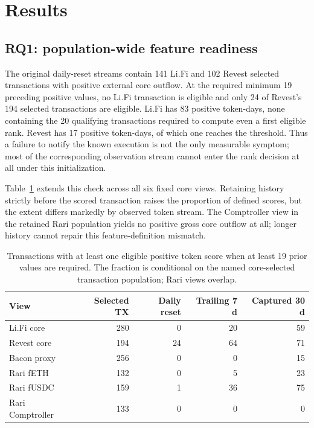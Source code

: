 \documentclass[preprint,12pt,authoryear]{elsarticle}
\begin{document}
\section{Results}\label{sec:results}

\subsection{RQ1: population-wide feature readiness}
The original daily-reset streams contain 141 Li.Fi and 102 Revest selected transactions with positive external core outflow. At the required minimum 19 preceding positive values, no Li.Fi transaction is eligible and only 24 of Revest's 194 selected transactions are eligible. Li.Fi has 83 positive token-days, none containing the 20 qualifying transactions required to compute even a first eligible rank. Revest has 17 positive token-days, of which one reaches the threshold. Thus a failure to notify the known execution is not the only measurable symptom; most of the corresponding observation stream cannot enter the rank decision at all under this initialization.

Table~\ref{tab:eligibility} extends this check across all six fixed core views. Retaining history strictly before the scored transaction raises the proportion of defined scores, but the extent differs markedly by observed token stream. The Comptroller view in the retained Rari population yields no positive gross core outflow at all; longer history cannot repair this feature-definition mismatch.

\begin{table}[htbp]
\centering\small
\caption{Transactions with at least one eligible positive token score when at least 19 prior values are required. The fraction is conditional on the named core-selected transaction population; Rari views overlap.}
\label{tab:eligibility}
\begin{tabular}{lrrrr}
\toprule
View & Selected TX & Daily reset & Trailing 7 d & Captured 30 d \\
\midrule
Li.Fi core & 280 & 0 & 20 & 59 \\
Revest core & 194 & 24 & 64 & 71 \\
Bacon proxy & 256 & 0 & 0 & 15 \\
Rari fETH & 132 & 0 & 5 & 23 \\
Rari fUSDC & 159 & 1 & 36 & 75 \\
Rari Comptroller & 133 & 0 & 0 & 0 \\
\bottomrule
\end{tabular}
\end{table}
\end{document}
